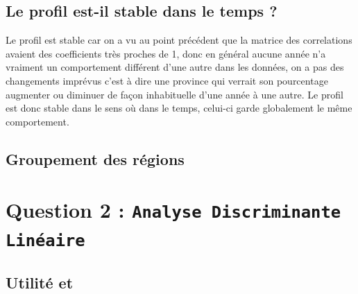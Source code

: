 \documentclass{article}
\begin{document}
 \newpage
\subsection{Le profil est-il stable dans le temps ?}

Le profil est stable car on a vu au point précédent que la matrice des correlations avaient des coefficients très proches de 1, donc en général aucune année n'a vraiment un comportement différent d'une autre dans les données, on a pas des changements imprévus c'est à dire une province qui verrait son pourcentage augmenter ou diminuer de façon inhabituelle d'une année à une autre. Le profil est donc stable dans le sens où dans le temps, celui-ci garde globalement le même comportement. 

\subsection{Groupement des régions}

\section{Question 2 : \texttt{Analyse Discriminante Linéaire}}

\subsection{Utilité et }
\end{document}
